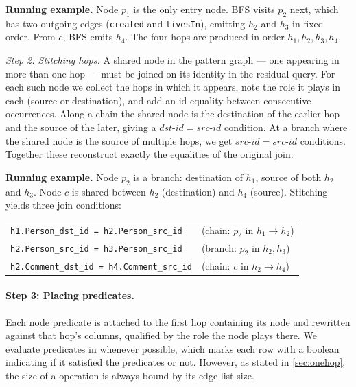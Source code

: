 \noindent\textbf{Running example.} Node $p_1$ is the only entry node. BFS
visits $p_2$ next, which has two outgoing edges (\texttt{created} and
\texttt{livesIn}), emitting $h_2$ and $h_3$ in fixed order. From $c$, BFS
emits $h_4$. The four hops are produced in order $h_1, h_2, h_3, h_4$.

\emph{Step 2: Stitching hops.}
A shared node in the pattern graph --- one appearing in more than one hop --- must be
joined on its identity in the residual query. For each such node we collect
the hops in which it appears, note the role it plays in each (source or
destination), and add an id-equality between consecutive occurrences. Along
a chain the shared node is the destination of the earlier hop and the
source of the later, giving a $\mathit{dst}\text{-}\mathit{id} =
\mathit{src}\text{-}\mathit{id}$ condition. At a branch where the shared node is
the source of multiple hops, we get $\mathit{src}\text{-}\mathit{id} =
\mathit{src}\text{-}\mathit{id}$ conditions. Together these reconstruct
exactly the equalities of the original join.

\noindent\textbf{Running example.} Node $p_2$ is a branch: destination of
$h_1$, source of both $h_2$ and $h_3$. Node $c$ is shared between $h_2$
(destination) and $h_4$ (source). Stitching yields three join conditions:
\begin{center}
\small
\begin{tabular}{@{}ll@{}}
\texttt{h1.Person\_dst\_id = h2.Person\_src\_id} & (chain: $p_2$ in
$h_1{\to}h_2$)\\
\texttt{h2.Person\_src\_id = h3.Person\_src\_id} & (branch: $p_2$ in
$h_2, h_3$)\\
\texttt{h2.Comment\_dst\_id = h4.Comment\_src\_id} & (chain: $c$ in
$h_2{\to}h_4$)\\
\end{tabular}
\end{center}

\paragraph{Step 3: Placing predicates.}
Each node predicate is attached to the first hop containing its node and
rewritten against that hop's columns, qualified by the role the node plays
there. We evaluate predicates in \onehop whenever possible, which marks 
each row with a boolean indicating if it satisfied the predicates or not. However, as stated in \cref{sec:onehop}, the size of a \onehop operation
is always bound by its edge list size. 

